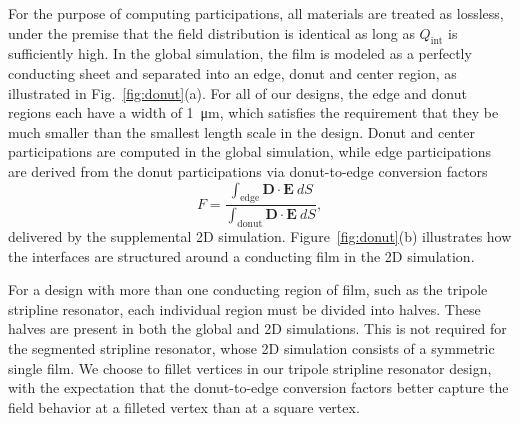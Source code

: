\documentclass[
    reprint,
    superscriptaddress,
    amsmath,amssymb,
    aps,
    prb,
    floatfix,
]{revtex4-2}
\begin{document}
For the purpose of computing participations, all materials are treated as lossless, under the premise that the field distribution is identical as long as $Q_\mathrm{int}$ is sufficiently high. In the global simulation, the film is modeled as a perfectly conducting sheet and separated into an edge, donut and center region, as illustrated in Fig.~\ref{fig:donut}(a). For all of our designs, the edge and donut regions each have a width of \SI{1}{\micro\meter}, which satisfies the requirement that they be much smaller than the smallest length scale in the design. Donut and center participations are computed in the global simulation, while edge participations are derived from the donut participations via donut-to-edge conversion factors
\begin{equation}
    F = \frac
        {\int_\mathrm{edge} \mathbf{D} \cdot \mathbf{E}~dS}
        {\int_\mathrm{donut} \mathbf{D} \cdot \mathbf{E}~dS},
    \label{eq:factor}
\end{equation}
delivered by the supplemental 2D simulation. Figure~\ref{fig:donut}(b) illustrates how the interfaces are structured around a conducting film in the 2D simulation.

For a design with more than one conducting region of film, such as the tripole stripline resonator, each individual region must be divided into halves. These halves are present in both the global and 2D simulations. This is not required for the segmented stripline resonator, whose 2D simulation consists of a symmetric single film. We choose to fillet vertices in our tripole stripline resonator design, with the expectation that the donut-to-edge conversion factors better capture the field behavior at a filleted vertex than at a square vertex.
\end{document}
